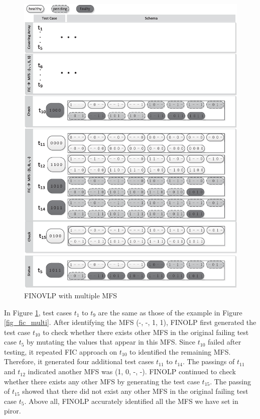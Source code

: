 \begin{figure}[!htb]
 \centering
 \includegraphics[width=5.3in]{finovlp.eps}
 \caption{FINOVLP with multiple MFS}
 \label{fig_finovlp_multi}
\end{figure}

In Figure \ref{fig_finovlp_multi}, test cases $t_{1}$ to $t_{9}$ are the same as those of the example in Figure \ref{fig_fic_multi}.  After identifying the MFS (-, -, 1, 1), FINOLP first generated the test case $t_{10}$ to check whether there exists other MFS in the original failing test case $t_{5}$ by mutating the values that appear in this MFS. Since $t_{10}$ failed after testing, it repeated FIC approach on $t_{10}$ to identified the remaining MFS. Therefore, it generated four additional test cases $t_{11}$ to $t_{14}$. The passings of $t_{11}$ and $t_{12}$ indicated another MFS was (1, 0, -, -). FINOLP continued to check whether there exists any other MFS by generating the test case $t_{15}$. The passing of $t_{15}$ showed that there did not exist any other MFS in the original failing test case $t_{5}$. Above all, FINOLP accurately identified all the MFS we have set in piror.

